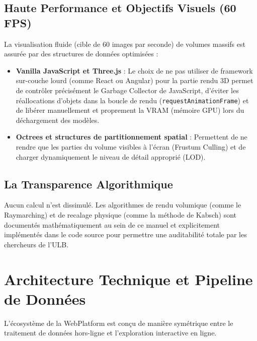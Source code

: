 \subsection{Haute Performance et Objectifs Visuels (60 FPS)}
La visualisation fluide (cible de 60 images par seconde) de volumes massifs est assurée par des structures de données optimisées :
\begin{itemize}
    \item \textbf{Vanilla JavaScript et Three.js} : Le choix de ne pas utiliser de framework sur-couche lourd (comme React ou Angular) pour la partie rendu 3D permet de contrôler précisément le Garbage Collector de JavaScript, d'éviter les réallocations d'objets dans la boucle de rendu (\texttt{requestAnimationFrame}) et de libérer manuellement et proprement la VRAM (mémoire GPU) lors du déchargement des modèles.
    \item \textbf{Octrees et structures de partitionnement spatial} : Permettent de ne rendre que les parties du volume visibles à l'écran (Frustum Culling) et de charger dynamiquement le niveau de détail approprié (LOD).
\end{itemize}

\subsection{La Transparence Algorithmique}
Aucun calcul n'est dissimulé. Les algorithmes de rendu volumique (comme le Raymarching) et de recalage physique (comme la méthode de Kabsch) sont documentés mathématiquement au sein de ce manuel et explicitement implémentés dans le code source pour permettre une auditabilité totale par les chercheurs de l'ULB.

\section{Architecture Technique et Pipeline de Données}

L'écosystème de la WebPlatform est conçu de manière symétrique entre le traitement de données hors-ligne et l'exploration interactive en ligne.

